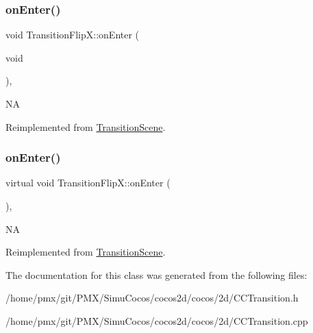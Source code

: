 \subsubsection{\texorpdfstring{on\+Enter()}{onEnter()}\hspace{0.1cm}{\footnotesize\ttfamily [1/2]}}
{\footnotesize\ttfamily void Transition\+Flip\+X\+::on\+Enter (\begin{DoxyParamCaption}\item[{void}]{ }\end{DoxyParamCaption})\hspace{0.3cm}{\ttfamily [override]}, {\ttfamily [virtual]}}

NA 

Reimplemented from \hyperlink{classTransitionScene_aace390a1bd8f3c73bb650a1e256a0f83}{Transition\+Scene}.

\mbox{\label{classTransitionFlipX_abe704195ebf90a0adb19bd54446f977b}} 
\subsubsection{\texorpdfstring{on\+Enter()}{onEnter()}\hspace{0.1cm}{\footnotesize\ttfamily [2/2]}}
{\footnotesize\ttfamily virtual void Transition\+Flip\+X\+::on\+Enter (\begin{DoxyParamCaption}{ }\end{DoxyParamCaption})\hspace{0.3cm}{\ttfamily [override]}, {\ttfamily [virtual]}}

NA 

Reimplemented from \hyperlink{classTransitionScene_aace390a1bd8f3c73bb650a1e256a0f83}{Transition\+Scene}.



The documentation for this class was generated from the following files\+:\begin{DoxyCompactItemize}
\item 
/home/pmx/git/\+P\+M\+X/\+Simu\+Cocos/cocos2d/cocos/2d/C\+C\+Transition.\+h\item 
/home/pmx/git/\+P\+M\+X/\+Simu\+Cocos/cocos2d/cocos/2d/C\+C\+Transition.\+cpp\end{DoxyCompactItemize}
